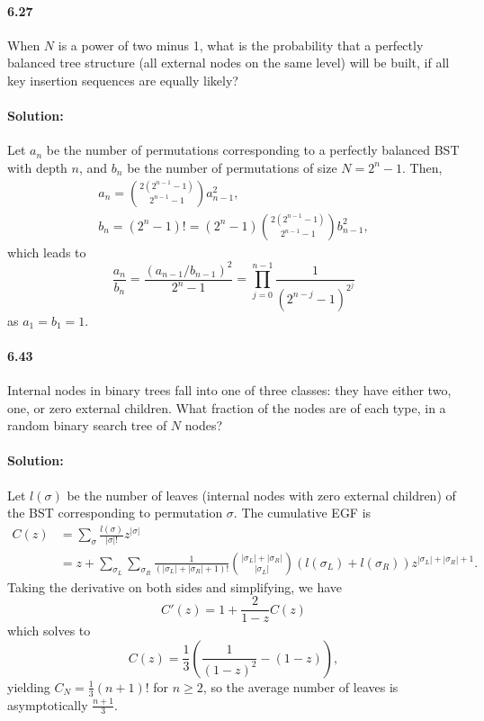 \documentclass{article}
\begin{document}
\paragraph{6.27} When $N$ is a power of two minus 1, what is the probability
that a perfectly balanced tree structure (all external nodes on the same level)
will be built, if all key insertion sequences are equally likely?

\paragraph{Solution:} Let $a_n$ be the number of permutations corresponding to
a perfectly balanced BST with depth $n$, and $b_n$ be the number of
permutations of size $N = 2^n - 1$. Then, \begin{gather*}
  a_n = \binom{2(2^{n - 1} - 1)}{2^{n - 1} - 1}a_{n - 1}^2, \\
  b_n = (2^n - 1)! = (2^n - 1)\binom{2(2^{n - 1} - 1)}{2^{n - 1} - 1}b_{n-1}^2,
\end{gather*} which leads to \begin{equation*}
  \frac{a_n}{b_n} = \frac{(a_{n - 1}/b_{n - 1})^2}{2^n - 1} =
  \prod_{j = 0}^{n - 1} \frac{1}{(2^{n - j} - 1)^{2^j}}
\end{equation*} as $a_1 = b_1 = 1$.

\paragraph{6.43} Internal nodes in binary trees fall into one of three classes:
they have either two, one, or zero external children. What fraction of the
nodes are of each type, in a random binary search tree of $N$ nodes?

\paragraph{Solution:} Let $l(\sigma)$ be the number of leaves (internal nodes
with zero external children) of the BST corresponding to permutation $\sigma$.
The cumulative EGF is \begin{align*}
  C(z) &= \sum_{\sigma} \frac{l(\sigma)}{|\sigma|!}z^{|\sigma|} \\
       &= z + \sum_{\sigma_L} \sum_{\sigma_R}
       \frac{1}{(|\sigma_L| + |\sigma_R| + 1)!}
       \binom{|\sigma_L| + |\sigma_R|}{|\sigma_L|}(l(\sigma_L) + l(\sigma_R))
       z^{|\sigma_L| + |\sigma_R| + 1}.
\end{align*} Taking the derivative on both sides and simplifying, we have
\begin{equation*}
  C'(z) = 1 + \frac{2}{1 - z}C(z)
\end{equation*} which solves to \begin{equation*}
  C(z) = \frac{1}{3}\left(\frac{1}{(1 - z)^2} - (1 - z)\right),
\end{equation*} yielding $C_N = \frac{1}{3}(n + 1)!$ for $n \geq 2$, so
the average number of leaves is asymptotically $\frac{n + 1}{3}$.
\end{document}
